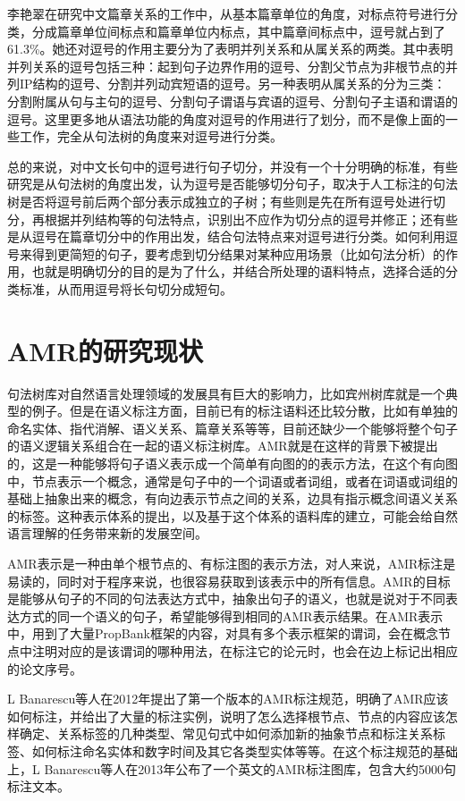 \documentclass[master, winfont]{njuthesis}
\begin{document}
李艳翠\cite{liyancui2015}在研究中文篇章关系的工作中，从基本篇章单位的角度，对标点符号进行分类，分成篇章单位间标点和篇章单位内标点，其中篇章间标点中，逗号就占到了61.3\%。她还对逗号的作用主要分为了表明并列关系和从属关系的两类。其中表明并列关系的逗号包括三种：起到句子边界作用的逗号、分割父节点为非根节点的并列IP结构的逗号、分割并列动宾短语的逗号。另一种表明从属关系的分为三类：分割附属从句与主句的逗号、分割句子谓语与宾语的逗号、分割句子主语和谓语的逗号。这里更多地从语法功能的角度对逗号的作用进行了划分，而不是像上面的一些工作，完全从句法树的角度来对逗号进行分类。

总的来说，对中文长句中的逗号进行句子切分，并没有一个十分明确的标准，有些研究是从句法树的角度出发，认为逗号是否能够切分句子，取决于人工标注的句法树是否将逗号前后两个部分表示成独立的子树；有些则是先在所有逗号处进行切分，再根据并列结构等的句法特点，识别出不应作为切分点的逗号并修正；还有些是从逗号在篇章切分中的作用出发，结合句法特点来对逗号进行分类。如何利用逗号来得到更简短的句子，要考虑到切分结果对某种应用场景（比如句法分析）的作用，也就是明确切分的目的是为了什么，并结合所处理的语料特点，选择合适的分类标准，从而用逗号将长句切分成短句。

\section{AMR的研究现状}
句法树库对自然语言处理领域的发展具有巨大的影响力，比如宾州树库就是一个典型的例子。但是在语义标注方面，目前已有的标注语料还比较分散，比如有单独的命名实体、指代消解、语义关系、篇章关系等等，目前还缺少一个能够将整个句子的语义逻辑关系组合在一起的语义标注树库。AMR就是在这样的背景下被提出的，这是一种能够将句子语义表示成一个简单有向图的的表示方法，在这个有向图中，节点表示一个概念，通常是句子中的一个词语或者词组，或者在词语或词组的基础上抽象出来的概念，有向边表示节点之间的关系，边具有指示概念间语义关系的标签。这种表示体系的提出，以及基于这个体系的语料库的建立，可能会给自然语言理解的任务带来新的发展空间。

AMR表示是一种由单个根节点的、有标注图的表示方法\cite{Banarescu2013Abstract}，对人来说，AMR标注是易读的，同时对于程序来说，也很容易获取到该表示中的所有信息。AMR的目标是能够从句子的不同的句法表达方式中，抽象出句子的语义，也就是说对于不同表达方式的同一个语义的句子，希望能够得到相同的AMR表示结果。在AMR表示中，用到了大量PropBank框架的内容，对具有多个表示框架的谓词，会在概念节点中注明对应的是该谓词的哪种用法，在标注它的论元时，也会在边上标记出相应的论文序号。

L Banarescu等人\cite{banarescu2012abstract}在2012年提出了第一个版本的AMR标注规范，明确了AMR应该如何标注，并给出了大量的标注实例，说明了怎么选择根节点、节点的内容应该怎样确定、关系标签的几种类型、常见句式中如何添加新的抽象节点和标注关系标签、如何标注命名实体和数字时间及其它各类型实体等等。在这个标注规范的基础上，L Banarescu等人\cite{Banarescu2013Abstract}在2013年公布了一个英文的AMR标注图库，包含大约5000句标注文本。
\end{document}
